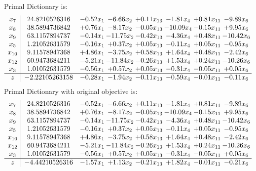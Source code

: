 \documentclass[9pt]{article}
\begin{document}
Primal Dictionary is:
\[\begin{array}{c| c c@{\hskip 2pt} c@{\hskip 2pt} c@{\hskip 2pt} c@{\hskip 2pt} c@{\hskip 2pt} c@{\hskip 2pt} }
 x_{7}   &  24.8210526316 & -0.52 x_{1} & -6.66 x_{2} & +  0.11 x_{13} & -1.81 x_{4} & +  0.81 x_{11} & -9.89 x_{6}\\
 x_{8}   &  38.5894736842 & +  0.76 x_{1} & -8.17 x_{2} & -0.05 x_{13} & -10.09 x_{4} & -0.15 x_{11} & +  9.95 x_{6}\\
 x_{9}   &  63.1157894737 & -0.14 x_{1} & -11.75 x_{2} & -0.42 x_{13} & -4.36 x_{4} & +  0.48 x_{11} & -10.42 x_{6}\\
 x_{5}   &  1.21052631579 & -0.16 x_{1} & +  0.37 x_{2} & +  0.05 x_{13} & -0.11 x_{4} & +  0.05 x_{11} & -0.95 x_{6}\\
 x_{10}   &  9.11578947368 & +  4.86 x_{1} & -3.75 x_{2} & +  0.58 x_{13} & +  1.64 x_{4} & +  0.48 x_{11} & -2.42 x_{6}\\
 x_{12}   &  60.9473684211 & -5.21 x_{1} & -11.84 x_{2} & -0.26 x_{13} & +  1.53 x_{4} & +  0.24 x_{11} & -10.26 x_{6}\\
 x_{3}   &  1.01052631579 & -0.56 x_{1} & +  0.57 x_{2} & +  0.05 x_{13} & -0.31 x_{4} & -0.05 x_{11} & +  0.05 x_{6}\\
\hline
z    &  -2.22105263158 & -0.28 x_{1} & -1.94 x_{2} & -0.11 x_{13} & -0.59 x_{4} & -0.01 x_{11} & -0.11 x_{6}\\
\end{array}\]
Primal Dictionary with original objective is:
\[\begin{array}{c| c c@{\hskip 2pt} c@{\hskip 2pt} c@{\hskip 2pt} c@{\hskip 2pt} c@{\hskip 2pt} c@{\hskip 2pt} }
 x_{7}   &  24.8210526316 & -0.52 x_{1} & -6.66 x_{2} & +  0.11 x_{13} & -1.81 x_{4} & +  0.81 x_{11} & -9.89 x_{6}\\
 x_{8}   &  38.5894736842 & +  0.76 x_{1} & -8.17 x_{2} & -0.05 x_{13} & -10.09 x_{4} & -0.15 x_{11} & +  9.95 x_{6}\\
 x_{9}   &  63.1157894737 & -0.14 x_{1} & -11.75 x_{2} & -0.42 x_{13} & -4.36 x_{4} & +  0.48 x_{11} & -10.42 x_{6}\\
 x_{5}   &  1.21052631579 & -0.16 x_{1} & +  0.37 x_{2} & +  0.05 x_{13} & -0.11 x_{4} & +  0.05 x_{11} & -0.95 x_{6}\\
 x_{10}   &  9.11578947368 & +  4.86 x_{1} & -3.75 x_{2} & +  0.58 x_{13} & +  1.64 x_{4} & +  0.48 x_{11} & -2.42 x_{6}\\
 x_{12}   &  60.9473684211 & -5.21 x_{1} & -11.84 x_{2} & -0.26 x_{13} & +  1.53 x_{4} & +  0.24 x_{11} & -10.26 x_{6}\\
 x_{3}   &  1.01052631579 & -0.56 x_{1} & +  0.57 x_{2} & +  0.05 x_{13} & -0.31 x_{4} & -0.05 x_{11} & +  0.05 x_{6}\\
\hline
z    &  -4.44210526316 & -1.57 x_{1} & +  1.13 x_{2} & -0.21 x_{13} & +  1.82 x_{4} & -0.01 x_{11} & -0.21 x_{6}\\
\end{array}\]
\end{document}
